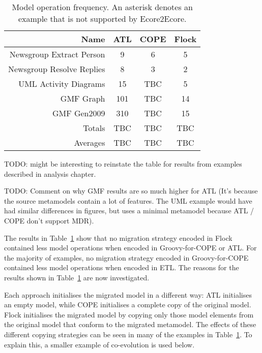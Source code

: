 \begin{table}
	\caption{Model operation frequency. An asterisk denotes an example that is not supported by Ecore2Ecore.}
	\centering
	\begin{tabular}{|r|c|c|c|}
		\hline
		Name                        & ATL & COPE & Flock \\
		\hline
		\hline
		Newsgroup Extract Person    & 9  &  6  &  5  \\
		\hline                       
		Newsgroup Resolve Replies   &  8  &  3  &  2  \\
		\hline                       
		UML Activity Diagrams       &  15  &  TBC  &  5  \\
		\hline                       
		GMF Graph                   &  101  &  TBC  &  14  \\
		\hline                       
		GMF Gen2009                 &  310  &  TBC  &  15  \\
		\hline
		\hline
		Totals                       & TBC & TBC  &  TBC \\
		\hline
		Averages                     &  TBC  &  TBC  &  TBC \\
		\hline
	\end{tabular}
	\label{tab:model_operations_results}
\end{table}

TODO: might be interesting to reinstate the table for results from examples described in analysis chapter.

TODO: Comment on why GMF results are so much higher for ATL (It's because the source metamodels contain a lot of features. The UML example would have had similar differences in figures, but uses a minimal metamodel because ATL / COPE don't support MDR).

The results in Table~\ref{tab:model_operations_results} show that no migration strategy encoded in Flock contained less model operations when encoded in Groovy-for-COPE or ATL. For the majority of examples, no migration strategy encoded in Groovy-for-COPE contained less model operations when encoded in ETL. The reasons for the results shown in Table~\ref{tab:model_operations_results} are now investigated.

Each approach initialises the migrated model in a different way: ATL initialises an empty model, while COPE initialises a complete copy of the original model. Flock initialises the migrated model by copying only those model elements from the original model that conform to the migrated metamodel. The effects of these different copying strategies can be seen in many of the examples in Table~\ref{tab:model_operations_results}. To explain this, a smaller example of co-evolution is used below.

